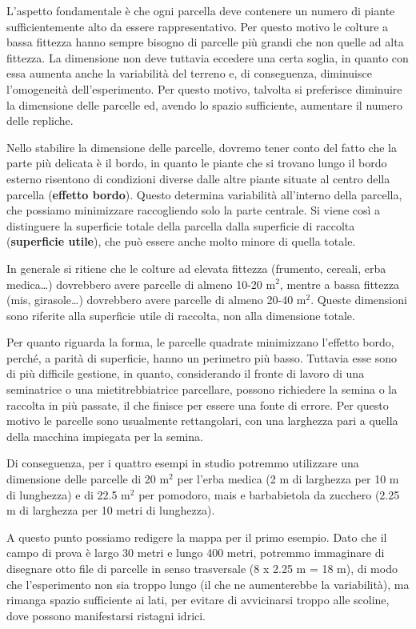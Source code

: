 \documentclass[a4paper,12pt,oneside]{book}
\theoremstyle{definition}
\theoremstyle{definition}
\theoremstyle{definition}
\theoremstyle{remark}
\begin{document}
L'aspetto fondamentale è che ogni parcella deve contenere un numero di
piante sufficientemente alto da essere rappresentativo. Per questo
motivo le colture a bassa fittezza hanno sempre bisogno di parcelle più
grandi che non quelle ad alta fittezza. La dimensione non deve tuttavia
eccedere una certa soglia, in quanto con essa aumenta anche la
variabilità del terreno e, di conseguenza, diminuisce l'omogeneità
dell'esperimento. Per questo motivo, talvolta si preferisce diminuire la
dimensione delle parcelle ed, avendo lo spazio sufficiente, aumentare il
numero delle repliche.

Nello stabilire la dimensione delle parcelle, dovremo tener conto del
fatto che la parte più delicata è il bordo, in quanto le piante che si
trovano lungo il bordo esterno risentono di condizioni diverse dalle
altre piante situate al centro della parcella (\textbf{effetto bordo}).
Questo determina variabilità all'interno della parcella, che possiamo
minimizzare raccogliendo solo la parte centrale. Si viene così a
distinguere la superficie totale della parcella dalla superficie di
raccolta (\textbf{superficie utile}), che può essere anche molto minore
di quella totale.

In generale si ritiene che le colture ad elevata fittezza (frumento,
cereali, erba medica\ldots{}) dovrebbero avere parcelle di almeno 10-20
m\(^2\), mentre a bassa fittezza (mis, girasole\ldots{}) dovrebbero
avere parcelle di almeno 20-40 m\(^2\). Queste dimensioni sono riferite
alla superficie utile di raccolta, non alla dimensione totale.

Per quanto riguarda la forma, le parcelle quadrate minimizzano l'effetto
bordo, perché, a parità di superficie, hanno un perimetro più basso.
Tuttavia esse sono di più difficile gestione, in quanto, considerando il
fronte di lavoro di una seminatrice o una mietitrebbiatrice parcellare,
possono richiedere la semina o la raccolta in più passate, il che
finisce per essere una fonte di errore. Per questo motivo le parcelle
sono usualmente rettangolari, con una larghezza pari a quella della
macchina impiegata per la semina.

Di conseguenza, per i quattro esempi in studio potremmo utilizzare una
dimensione delle parcelle di 20 m\(^2\) per l'erba medica (2 m di
larghezza per 10 m di lunghezza) e di 22.5 m\(^2\) per pomodoro, mais e
barbabietola da zucchero (2.25 m di larghezza per 10 metri di
lunghezza).

A questo punto possiamo redigere la mappa per il primo esempio. Dato che
il campo di prova è largo 30 metri e lungo 400 metri, potremmo
immaginare di disegnare otto file di parcelle in senso trasversale (8 x
2.25 m = 18 m), di modo che l'esperimento non sia troppo lungo (il che
ne aumenterebbe la variabilità), ma rimanga spazio sufficiente ai lati,
per evitare di avvicinarsi troppo alle scoline, dove possono
manifestarsi ristagni idrici.
\end{document}
